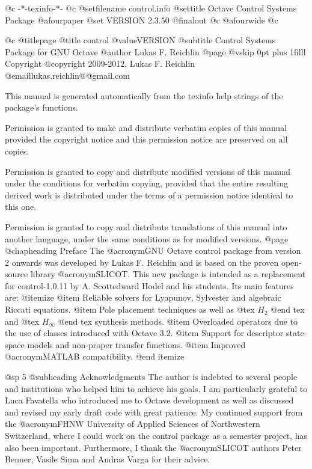    @c -*-texinfo-*-
@c %
@setfilename control.info
@settitle Octave Control Systems Package
@afourpaper
@set VERSION 2.3.50
@finalout
@c @afourwide
@c %

@c %
@titlepage
@title control @value{VERSION}
@subtitle Control Systems Package for GNU Octave
@author Lukas F. Reichlin
@page
@vskip 0pt plus 1filll
Copyright @copyright{} 2009-2012, Lukas F. Reichlin @email{lukas.reichlin@@gmail.com}

This manual is generated automatically from the texinfo help strings
of the package's functions.

Permission is granted to make and distribute verbatim copies of
this manual provided the copyright notice and this permission notice
are preserved on all copies.

Permission is granted to copy and distribute modified versions of this
manual under the conditions for verbatim copying, provided that the entire
resulting derived work is distributed under the terms of a permission
notice identical to this one.

Permission is granted to copy and distribute translations of this manual
into another language, under the same conditions as for modified versions.
@page
@chapheading Preface
The @acronym{GNU} Octave control package from version 2 onwards was
developed by Lukas F. Reichlin and is based on the proven open-source
library @acronym{SLICOT}. This new package is intended as a replacement
for control-1.0.11 by A. Scottedward Hodel and his students.
Its main features are:
@itemize
@item Reliable solvers for Lyapunov, Sylvester and algebraic Riccati equations.
@item Pole placement techniques as well as @tex $ H_2 $ @end tex
and @tex $ H_{\infty} $ @end tex
synthesis methods.
@item Overloaded operators due to the use of classes introduced with Octave 3.2.
@item Support for descriptor state-space models and non-proper transfer functions.
@item Improved @acronym{MATLAB} compatibility.
@end itemize

@sp 5
@subheading Acknowledgments
The author is indebted to several people and institutions who helped
him to achieve his goals. I am particularly grateful to Luca Favatella
who introduced me to Octave development as well as discussed and revised
my early draft code with great patience. My continued support from the
@acronym{FHNW} University of Applied Sciences of Northwestern Switzerland,
where I could work on the control package as a semester project, has also
been important. Furthermore, I thank the @acronym{SLICOT} authors
Peter Benner, Vasile Sima and Andras Varga for their advice.



